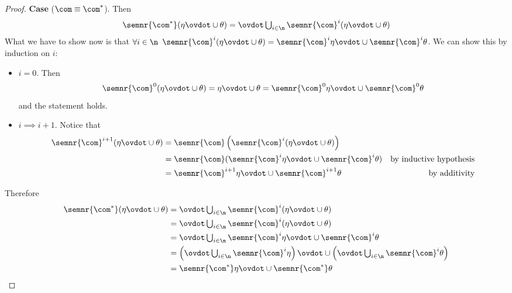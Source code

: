 \begin{proof}
  \noindent
  \textbf{Case}  (\(\com \equiv \com^*\)).
  Then
  \begin{equation*}
    \semnr{\com^*}(\eta\ovdot\cup\theta) = \textstyle \ovdot\bigcup_{i\in\n} \semnr{\com}^i(\eta \ovdot\cup \theta) \\
  \end{equation*}
  What we have to show now is that \(\forall i \in \n\)
  \(\semnr{\com}^i(\eta \ovdot\cup \theta) = \semnr{\com}^i \eta \ovdot\cup
  \semnr{\com}^i\theta\). We can show this by induction on \(i\):
  \begin{itemize}
    \item  \(i=0\). Then
    \begin{equation*}
      \semnr{\com}^0(\eta\ovdot\cup\theta) = \eta\ovdot\cup\theta = \semnr{\com}^0\eta \ovdot\cup \semnr{\com}^0\theta
    \end{equation*}
    and the statement holds.
    \item  \(i \implies i + 1\). Notice that
    \begin{align*}
      \semnr{\com}^{i+1}(\eta \ovdot\cup \theta) & = \semnr{\com}\left(\semnr{\com}^i(\eta \ovdot\cup \theta)\right) \\
                                             & = \semnr{\com}(\semnr{\com}^i\eta \ovdot\cup \semnr{\com}^i\theta) & \text{by inductive hypothesis} \\
                                             & = \semnr{\com}^{i+1}\eta \ovdot\cup \semnr{\com}^{i+1}\theta & \text{by additivity}
    \end{align*}
  \end{itemize}
  Therefore
  \begin{align*}
    \semnr{\com^*}(\eta\ovdot\cup\theta) & = \textstyle \ovdot\bigcup_{i\in\n} \semnr{\com}^i(\eta \ovdot\cup \theta) \\
                                     & = \textstyle \ovdot\bigcup_{i\in\n}\semnr{\com}^i(\eta \ovdot\cup \theta) \\
                                     & = \textstyle \ovdot\bigcup_{i\in\n}\semnr{\com}^i\eta \ovdot\cup \semnr{\com}^i\theta \\
                                     & = \left(\textstyle \ovdot\bigcup_{i\in\n} \semnr{\com}^i\eta\right) \ovdot\cup \left(\textstyle \ovdot\bigcup_{i\in\n} \semnr{\com}^i\theta\right) \\
                                     & = \semnr{\com^*} \eta \ovdot\cup \semnr{\com^*}\theta
  \end{align*}
\end{proof}

